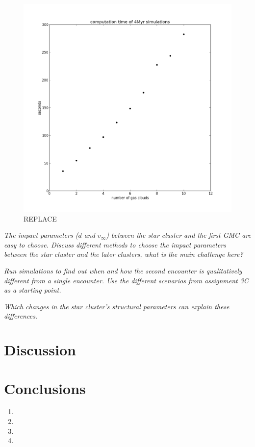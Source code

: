 \documentclass{aa}
\begin{document}
\begin{figure}
    \centering
    \includegraphics[width=\hsize]{img/multi_gmc_timings.png}
    \caption{REPLACE}\label{fig:scaling}
\end{figure}

\textit{The impact parameters ($d$ and $v_\infty$) between the star cluster and the first GMC are easy to choose. Discuss different methods to choose the impact parameters between the star cluster and the later clusters, what is the main challenge here?}

\textit{Run simulations to find out when and how the second encounter is qualitatively different from a single encounter. Use the different scenarios from assignment 3C as a starting point.}

\textit{Which changes in the star cluster's structural parameters can explain these differences.}



\section{Discussion}\label{sec:discussion}

\section{Conclusions}\label{sec:conclusions}
\begin{enumerate}
    \item
    \item
    \item
    \item
\end{enumerate}
\end{document}
